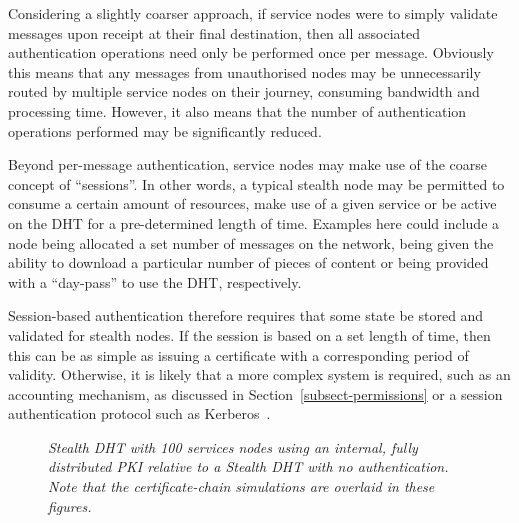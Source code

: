 \documentclass[times, 10pt,twocolumn]{article}
\begin{document}
Considering a slightly coarser approach, if service nodes were to
simply validate messages upon receipt at their final destination, then
all associated authentication operations need only be performed once
per message. Obviously this means that any messages from unauthorised
nodes may be unnecessarily routed by multiple service nodes on their
journey, consuming bandwidth and processing time. However, it also
means that the number of authentication operations performed may be
significantly reduced.

Beyond per-message authentication, service nodes may make use of the
coarse concept of ``sessions''. In other words, a typical stealth node
may be permitted to consume a certain amount of resources, make use of
a given service or be active on the DHT for a pre-determined length of
time. Examples here could include a node being allocated a set number
of messages on the network, being given the ability to download a
particular number of pieces of content or being provided with a
``day-pass'' to use the DHT, respectively.

Session-based authentication therefore requires that some state be
stored and validated for stealth nodes. If the session is based on a
set length of time, then this can be as simple as issuing a certificate
with a corresponding period of validity. Otherwise, it is likely that a
more complex system is required, such as an accounting mechanism, as
discussed in Section~\ref{subsect-permissions} or a session
authentication protocol such as Kerberos~\cite{Neuman94Kerberos}.

\begin{figure}[tb]
\center
{}
\caption{\em Stealth DHT with 100 services nodes using an internal,
fully distributed PKI relative to a Stealth DHT with no authentication.
Note that the certificate-chain simulations are overlaid in these figures.}
\label{fig-granularities}
\end{figure}
\end{document}

